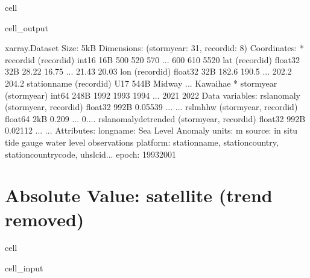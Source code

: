 \documentclass[letterpaper,10pt,english]{jupyterBook}
\begin{document}
\begin{sphinxuseclass}{cell}
\begin{sphinxVerbatimOutput}
\begin{sphinxuseclass}{cell_output}
\begin{sphinxVerbatim}[commandchars=\\\{\}]
\PYGZlt{}xarray.Dataset\PYGZgt{} Size: 5kB
Dimensions:                (storm\PYGZus{}year: 31, record\PYGZus{}id: 8)
Coordinates:
  * record\PYGZus{}id              (record\PYGZus{}id) int16 16B 500 520 570 ... 600 610 5520
    lat                    (record\PYGZus{}id) float32 32B 28.22 16.75 ... 21.43 20.03
    lon                    (record\PYGZus{}id) float32 32B 182.6 190.5 ... 202.2 204.2
    station\PYGZus{}name           (record\PYGZus{}id) \PYGZlt{}U17 544B \PYGZsq{}Midway\PYGZsq{} ... \PYGZsq{}Kawaihae\PYGZsq{}
  * storm\PYGZus{}year             (storm\PYGZus{}year) int64 248B 1992 1993 1994 ... 2021 2022
Data variables:
    rsl\PYGZus{}anomaly            (storm\PYGZus{}year, record\PYGZus{}id) float32 992B \PYGZhy{}0.05539 ... ...
    rsl\PYGZus{}mhhw               (storm\PYGZus{}year, record\PYGZus{}id) float64 2kB \PYGZhy{}0.209 ... \PYGZhy{}0....
    rsl\PYGZus{}anomaly\PYGZus{}detrended  (storm\PYGZus{}year, record\PYGZus{}id) float32 992B \PYGZhy{}0.02112 ... ...
Attributes:
    long\PYGZus{}name:  Sea Level Anomaly
    units:      m
    source:     in situ tide gauge water level observations
    platform:   station\PYGZus{}name, station\PYGZus{}country, station\PYGZus{}country\PYGZus{}code, uhslc\PYGZus{}id...
    epoch:      1993\PYGZhy{}2001
\end{sphinxVerbatim}

\end{sphinxuseclass}\end{sphinxVerbatimOutput}

\end{sphinxuseclass}

\part{Absolute Value: satellite (trend removed)}
\label{\detokenize{notebooks/regional_and_local/SL_anomaly_annual:absolute-value-satellite-trend-removed}}
\begin{sphinxuseclass}{cell}\begin{sphinxVerbatimInput}

\begin{sphinxuseclass}{cell_input}
\begin{sphinxVerbatim}[commandchars=\\\{\}]
    
\end{sphinxVerbatim}

\end{sphinxuseclass}\end{sphinxVerbatimInput}

\end{sphinxuseclass}
\end{document}
